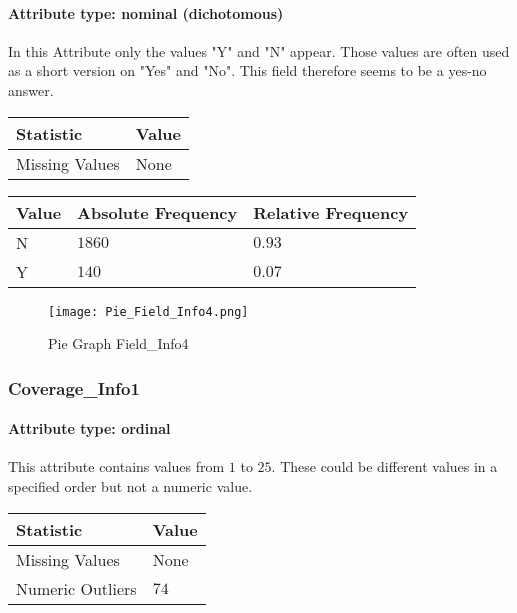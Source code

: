 \paragraph{Attribute type: nominal (dichotomous)} In this Attribute only the values "Y" and "N" appear. Those values are often used as a short version on "Yes" and "No". This field therefore seems to be a yes-no answer.
\qquad
\begin{table}[H]
	\renewcommand{\arraystretch}{1.25}
	\begin{tabular}{l|l}
		\textbf{Statistic} & \textbf{Value}\\\hline
		Missing Values& None\\\hline
	\end{tabular}
\end{table}
\begin{table}[H]
	\renewcommand{\arraystretch}{1.25}
	\begin{tabular}{l|l|l}
		\textbf{Value} & \textbf{Absolute Frequency} & \textbf{Relative Frequency}\\\hline
		N	&$1860$&$0.93$\\\hline
		Y&	$140$&$0.07$
	\end{tabular}
\end{table}

\begin{figure}[H]
	\begin{center}
		\texttt{[image: Pie\_Field\_Info4.png]}
	\end{center}
	\caption{Pie Graph Field\_Info4}
\end{figure}

\subsubsection{Coverage\_Info1}
\paragraph{Attribute type: ordinal} This attribute contains values from $1$ to $25$.  These could be different values in a specified order but not a numeric value.

\begin{table}[H]
	\renewcommand{\arraystretch}{1.25}
	\begin{tabular}{l|l}
		\textbf{Statistic} & \textbf{Value}\\\hline
		Missing Values& None\\\hline
		Numeric Outliers & $74$
	\end{tabular}
\end{table}

